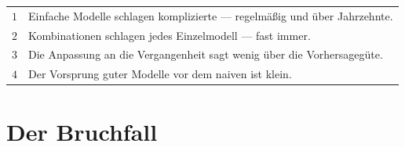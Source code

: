 \begin{merksatz}
\begin{center}
{\small
\renewcommand{\arraystretch}{1.52}
\begin{tabular}{@{}P{1.0cm}P{7.4cm}@{}}
\toprule
$1$ & Einfache Modelle schlagen komplizierte --- regelmäßig und über Jahrzehnte.\\
$2$ & Kombinationen schlagen jedes Einzelmodell --- fast immer.\\
$3$ & Die Anpassung an die Vergangenheit sagt wenig über die Vorhersagegüte.\\
$4$ & Der Vorsprung guter Modelle vor dem naiven ist klein.\\
\bottomrule
\end{tabular}}
\end{center}

\begin{center}
\begin{minipage}{0.88\textwidth}
\end{minipage}
\end{center}
\end{merksatz}

\section{Der Bruchfall}

